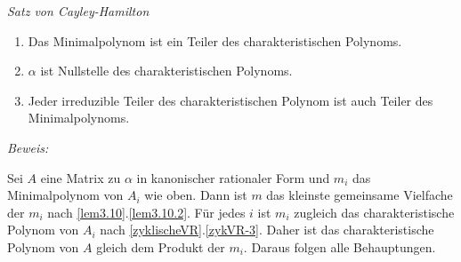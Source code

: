 \begin{mysatz}\label{CayleyHamilton} \textit{Satz von Cayley-Hamilton} \par
    \begin{enumerate}
        \item Das Minimalpolynom ist ein Teiler des charakteristischen Polynoms.
        \item $\alpha$ ist Nullstelle des charakteristischen Polynoms.
        \item Jeder irreduzible Teiler des charakteristischen Polynom ist auch Teiler des Minimalpolynoms.
    \end{enumerate}

\textit{Beweis:}

    Sei $A$ eine Matrix zu $\alpha$ in kanonischer rationaler Form und $m_i$ das Minimalpolynom von $A_i$ wie oben.
    Dann ist $m$ das kleinste gemeinsame Vielfache der $m_i$ nach \ref{lem3.10}.\ref{lem3.10.2}.
    Für jedes $i$ ist $m_i$ zugleich das charakteristische Polynom von $A_i$ nach \ref{zyklischeVR}.\ref{zykVR-3}.
    Daher ist das charakteristische Polynom von $A$ gleich dem Produkt der $m_i$. Daraus folgen alle Behauptungen.
\end{mysatz}



